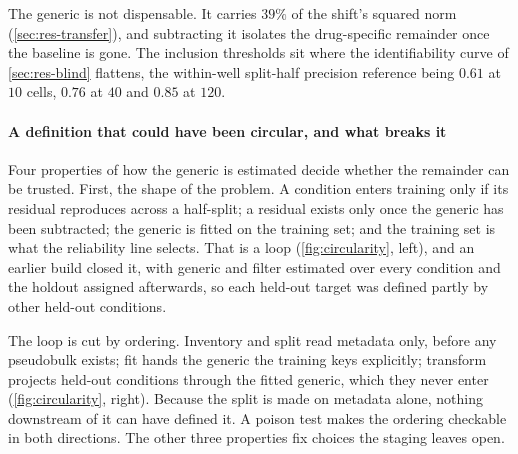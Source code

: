 The generic is not dispensable. It carries $39\%$ of the shift's squared norm
(\cref{sec:res-transfer}), and subtracting it isolates the drug-specific
remainder once the baseline is gone. The inclusion thresholds sit where the
identifiability curve of \cref{sec:res-blind} flattens, the within-well
split-half precision reference being $0.61$ at $10$ cells, $0.76$ at $40$ and
$0.85$ at $120$.

\paragraph{A definition that could have been circular, and what breaks it} Four
properties of how the generic is estimated decide whether the remainder can be
trusted. First, the shape of the problem. A condition enters training only if its
residual reproduces across a half-split; a residual exists only once the generic
has been subtracted; the generic is fitted on the training set; and the training
set is what the reliability line selects. That is a loop
(\cref{fig:circularity}, left), and an earlier build closed it, with generic and
filter estimated over every condition and the holdout assigned afterwards, so
each held-out target was defined partly by other held-out conditions.

The loop is cut by ordering. Inventory and split read metadata only, before any
pseudobulk exists; fit hands the generic the training keys explicitly; transform
projects held-out conditions through the fitted generic, which they never enter
(\cref{fig:circularity}, right). Because the split is made on metadata alone,
nothing downstream of it can have defined it. A poison test makes the ordering
checkable in both directions. The
other three properties fix choices the staging leaves open.



